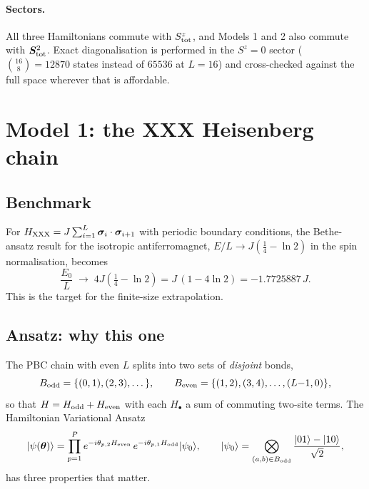 \documentclass[10pt,a4paper]{article}
\newcommand{\ket}[1]{\lvert #1 \rangle}
\newcommand{\ssig}{\bm{\sigma}}
\begin{document}
\paragraph{Sectors.} All three Hamiltonians commute with $S^z_{\rm tot}$, and
Models 1 and 2 also commute with $\bm{S}^2_{\rm tot}$. Exact diagonalisation is
performed in the $S^z = 0$ sector ($\binom{16}{8} = 12870$ states instead of
$65536$ at $L=16$) and cross-checked against the full space wherever that is
affordable.

\section{Model 1: the XXX Heisenberg chain}

\subsection{Benchmark}

For $H_{\rm XXX} = J\sum_{i=1}^{L}\ssig_i\cdot\ssig_{i+1}$ with periodic
boundary conditions, the Bethe-ansatz result for the isotropic
antiferromagnet, $E/L \to J(\tfrac14 - \ln 2)$ in the spin normalisation,
becomes
\begin{equation}
  \frac{E_0}{L} \;\longrightarrow\; 4J\left(\tfrac14 - \ln 2\right)
  = J\,(1 - 4\ln 2) = -1.7725887\,J .
\end{equation}
This is the target for the finite-size extrapolation.

\subsection{Ansatz: why this one}

The PBC chain with even $L$ splits into two sets of \emph{disjoint} bonds,
\begin{equation}
  B_{\rm odd} = \{(0,1),(2,3),\dots\},\qquad
  B_{\rm even} = \{(1,2),(3,4),\dots,(L{-}1,0)\},
\end{equation}
so that $H = H_{\rm odd} + H_{\rm even}$ with each $H_\bullet$ a sum of
commuting two-site terms. The Hamiltonian Variational Ansatz
\begin{equation}
  \ket{\psi(\bm\theta)} = \prod_{p=1}^{P}
  e^{-i\theta_{p,2} H_{\rm even}}\, e^{-i\theta_{p,1} H_{\rm odd}}
  \ket{\psi_0},
  \qquad
  \ket{\psi_0} = \bigotimes_{(a,b)\in B_{\rm odd}}
  \frac{\ket{01}-\ket{10}}{\sqrt 2},
  \label{eq:hva}
\end{equation}
has three properties that matter.
\end{document}
